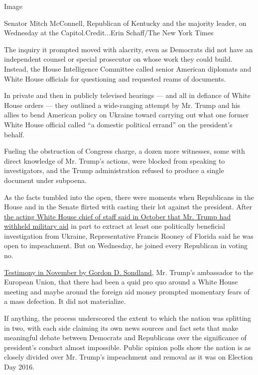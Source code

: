 Image

Senator Mitch McConnell, Republican of Kentucky and the majority leader,
on Wednesday at the Capitol.Credit...Erin Schaff/The New York Times

The inquiry it prompted moved with alacrity, even as Democrats did not
have an independent counsel or special prosecutor on whose work they
could build. Instead, the House Intelligence Committee called senior
American diplomats and White House officials for questioning and
requested reams of documents.

In private and then in publicly televised hearings --- and all in
defiance of White House orders --- they outlined a wide-ranging attempt
by Mr. Trump and his allies to bend American policy on Ukraine toward
carrying out what one former White House official called ``a domestic
political errand'' on the president's behalf.

Fueling the obstruction of Congress charge, a dozen more witnesses, some
with direct knowledge of Mr. Trump's actions, were blocked from speaking
to investigators, and the Trump administration refused to produce a
single document under subpoena.

As the facts tumbled into the open, there were moments when Republicans
in the House and in the Senate flirted with casting their lot against
the president. After
\href{https://www.nytimes.com/2019/10/17/us/politics/mick-mulvaney-trump-ukraine.html}{the
acting White House chief of staff said in October that Mr. Trump had
withheld military aid} in part to extract at least one politically
beneficial investigation from Ukraine, Representative Francis Rooney of
Florida said he was open to impeachment. But on Wednesday, he joined
every Republican in voting no.

\href{https://www.nytimes.com/2019/11/20/us/politics/sondland-says-he-followed-trumps-orders-to-pressure-ukraine.html}{Testimony
in November by Gordon D. Sondland}, Mr. Trump's ambassador to the
European Union, that there had been a quid pro quo around a White House
meeting and maybe around the foreign aid money prompted momentary fears
of a mass defection. It did not materialize.

If anything, the process underscored the extent to which the nation was
splitting in two, with each side claiming its own news sources and fact
sets that make meaningful debate between Democrats and Republicans over
the significance of president's conduct almost impossible. Public
opinion polls show the nation is as closely divided over Mr. Trump's
impeachment and removal as it was on Election Day 2016.

